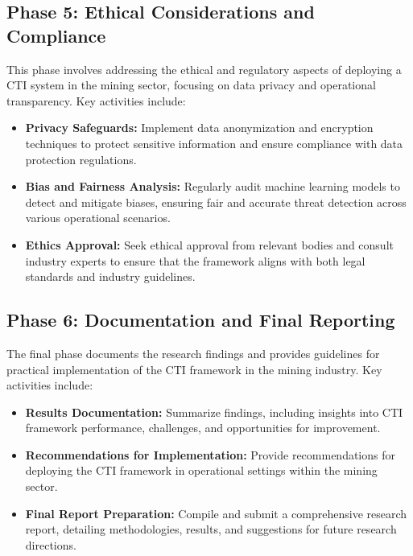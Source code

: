 \documentclass[a4paper,twoside,12pt]{report}
\begin{document}
\subsection{Phase 5: Ethical Considerations and Compliance}
This phase involves addressing the ethical and regulatory aspects of deploying a CTI system in the mining sector, focusing on data privacy and operational transparency. Key activities include:
\begin{itemize}
    \item \textbf{Privacy Safeguards:} Implement data anonymization and encryption techniques to protect sensitive information and ensure compliance with data protection regulations.
    \item \textbf{Bias and Fairness Analysis:} Regularly audit machine learning models to detect and mitigate biases, ensuring fair and accurate threat detection across various operational scenarios.
    \item \textbf{Ethics Approval:} Seek ethical approval from relevant bodies and consult industry experts to ensure that the framework aligns with both legal standards and industry guidelines.
\end{itemize}

\subsection{Phase 6: Documentation and Final Reporting}
The final phase documents the research findings and provides guidelines for practical implementation of the CTI framework in the mining industry. Key activities include:
\begin{itemize}
    \item \textbf{Results Documentation:} Summarize findings, including insights into CTI framework performance, challenges, and opportunities for improvement.
    \item \textbf{Recommendations for Implementation:} Provide recommendations for deploying the CTI framework in operational settings within the mining sector.
    \item \textbf{Final Report Preparation:} Compile and submit a comprehensive research report, detailing methodologies, results, and suggestions for future research directions.
\end{itemize}
\end{document}
